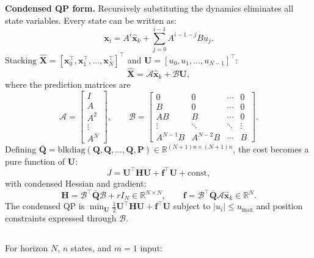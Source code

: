 \textbf{Condensed QP form.} Recursively substituting the dynamics eliminates all state variables. Every state can be written as:
\begin{equation}
    \mathbf{x}_i = A^i\hat{\mathbf{x}}_k + \sum_{j=0}^{i-1}A^{i-1-j}Bu_j.
\end{equation}
Stacking $\hat{\mathbf{X}} = [\mathbf{x}_0^\top, \mathbf{x}_1^\top, \ldots, \mathbf{x}_N^\top]^\top$ and $\mathbf{U} = [u_0, u_1, \ldots, u_{N-1}]^\top$:
\begin{equation}
    \hat{\mathbf{X}} = \mathcal{A}\hat{\mathbf{x}}_k + \mathcal{B}\mathbf{U},
\end{equation}
where the prediction matrices are
\begin{equation}
    \mathcal{A} = \begin{bmatrix} I \\ A \\ A^2 \\ \vdots \\ A^N \end{bmatrix}, \qquad
    \mathcal{B} = \begin{bmatrix}
        0 & 0 & \cdots & 0 \\
        B & 0 & \cdots & 0 \\
        AB & B & \cdots & 0 \\
        \vdots & \ddots & \ddots & \vdots \\
        A^{N-1}B & A^{N-2}B & \cdots & B
    \end{bmatrix}.
\end{equation}
Defining $\bar{\mathbf{Q}} = \mathrm{blkdiag}(\mathbf{Q},\mathbf{Q},\ldots,\mathbf{Q},\mathbf{P}) \in \mathbb{R}^{(N+1)n\times(N+1)n}$, the cost becomes a pure function of $\mathbf{U}$:
\begin{equation}
    J = \mathbf{U}^\top \mathbf{H}\mathbf{U} + \mathbf{f}^\top\mathbf{U} + \mathrm{const},
\end{equation}
with condensed Hessian and gradient:
\begin{equation}
    \mathbf{H} = \mathcal{B}^\top\bar{\mathbf{Q}}\mathcal{B} + rI_N \in \mathbb{R}^{N\times N}, \qquad
    \mathbf{f} = \mathcal{B}^\top\bar{\mathbf{Q}}\mathcal{A}\hat{\mathbf{x}}_k \in \mathbb{R}^N.
\end{equation}
The condensed QP is $\min_{\mathbf{U}}\frac{1}{2}\mathbf{U}^\top\mathbf{H}\mathbf{U} + \mathbf{f}^\top\mathbf{U}$ subject to $|u_i| \leq u_{\max}$ and position constraints expressed through $\mathcal{B}$.

\subsection{}
For horizon $N$, $n$ states, and $m = 1$ input:

